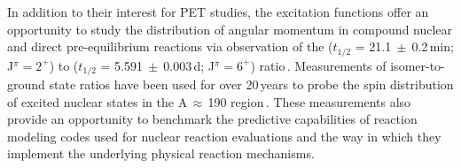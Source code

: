 In addition to their interest for PET studies, the  excitation functions 
offer an opportunity to study the distribution of angular momentum in compound nuclear and direct pre-equilibrium reactions via observation of the  ($t_{1/2}$ = 21.1$~\pm~$0.2\,min; J$^\pi=2^+$) to  ($t_{1/2}$ = 5.591$~\pm~$0.003\,d; J$^\pi=6^+$)   ratio\,\cite{Dong2015,Wang2017}.
Measurements of isomer-to-ground state ratios have been used for over 20\,years to probe the spin distribution of excited nuclear states in the A\,$\approx$\,190 region\,\cite{PhysRevC.73.034613,PhysRevC.45.1171}.
These measurements also provide an opportunity to benchmark 
the predictive capabilities of  reaction modeling codes used for nuclear reaction evaluations and the way in which they implement the underlying physical reaction mechanisms.  










